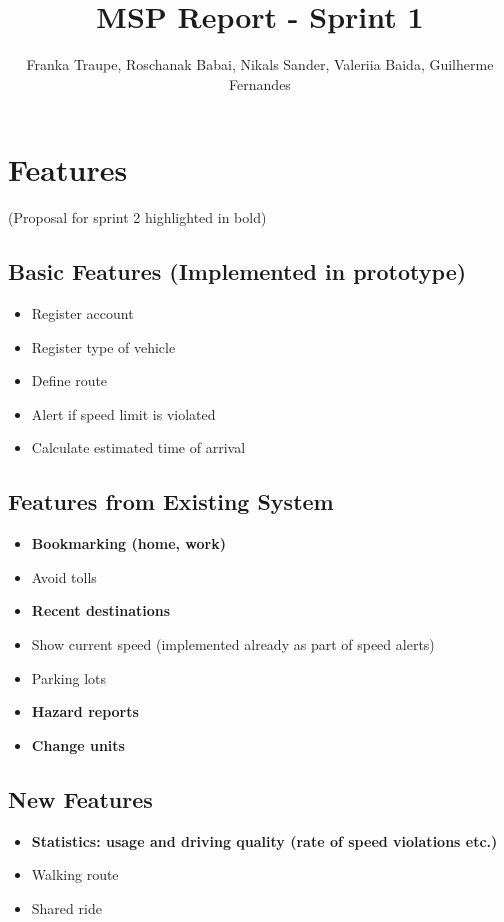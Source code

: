 \documentclass{article}
\title{MSP Report - Sprint 1}
\author{Franka Traupe, Roschanak Babai, Nikals Sander, Valeriia Baida, Guilherme Fernandes}
\date{}
\begin{document}
\maketitle

\section*{Features}
(Proposal for sprint 2 highlighted in bold)

\subsection*{Basic Features (Implemented in prototype)}
\begin{itemize}
    \item Register account
    \item Register type of vehicle
    \item Define route
    \item Alert if speed limit is violated
    \item Calculate estimated time of arrival
\end{itemize}

\subsection*{Features from Existing System}
\begin{itemize}
    \item \textbf{Bookmarking (home, work)}
    \item Avoid tolls
    \item \textbf{Recent destinations}
    \item Show current speed (implemented already as part of speed alerts)
    \item Parking lots
    \item \textbf{Hazard reports}
    \item \textbf{Change units}
\end{itemize}

\subsection*{New Features}
\begin{itemize}
    \item \textbf{Statistics: usage and driving quality (rate of speed violations etc.)}
    \item Walking route
    \item Shared ride
\end{itemize}
\end{document}
